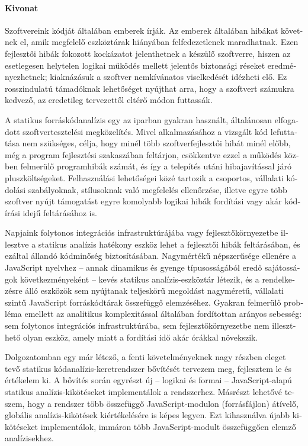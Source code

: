 \begin{otherlanguage}{magyar}

  \paragraph*{Kivonat}
  \thispagestyle{plain}

  Szoftvereink kódját általában emberek írják. Az emberek általában hibákat követnek el, amik megfelelő eszköztárak hiányában felfedezetlenek maradhatnak. Ezen fejlesztői hibák fokozott kockázatot jelenthetnek a készülő szoftverre, hiszen az esetlegesen helytelen logikai működés mellett jelentős biztonsági réseket eredményezhetnek; kiaknázásuk a szoftver nemkívánatos viselkedését idézheti elő. Ez rosszindulatú támadóknak lehetőséget nyújthat arra, hogy a szoftvert számukra kedvező, az eredetileg tervezettől eltérő módon futtassák.

  A statikus forráskódanalízis egy az iparban gyakran használt, általánosan elfogadott szoftvertesztelési megközelítés. Mivel alkalmazásához a vizsgált kód lefuttatása nem szükséges, célja, hogy minél több szoftverfejlesztői hibát minél előbb, még a program fejlesztési szakaszában feltárjon, csökkentve ezzel a működés közben felmerülő programhibák számát, és így a telepítés utáni hibajavítással járó pluszköltségeket. Felhasználási lehetőségei közé tartozik a csoportos, vállalati kódolási szabályoknak, stílusoknak való megfelelés ellenőrzése, illetve egyre több szoftver nyújt támogatást egyre komolyabb logikai hibák fordítási vagy akár kódírási idejű feltárásához is.

  Napjaink folytonos integrációs infrastruktúrájába vagy fejlesztőkörnyezetbe illesztve a statikus analízis hatékony eszköz lehet a fejlesztői hibák feltárásában, és ezáltal állandó kódminőség biztosításában. Nagymértékű népszerűsége ellenére a JavaScript nyelvhez – annak dinamikus és gyenge típusosságából eredő sajátosságok következményeként – kevés statikus analízis-eszköztár létezik, és a rendelkezésre álló eszközök sem nyújtanak teljeskörű megoldást nagyméretű, vállalati szintű JavaScript forráskódtárak összefüggő elemzéséhez. Gyakran felmerülő probléma emellett az analitikus komplexitással általában fordítottan arányos sebesség: sem folytonos integrációs infrastruktúrába, sem fejlesztőkörnyezetbe nem illeszthető olyan eszköz, amely miatt a fordítási idő akár órákkal növekszik.

  Dolgozatomban egy már létező, a fenti követelményeknek nagy részben eleget tevő statikus kódanalízis-keretrendszer bővítését tervezem meg, fejlesztem le és értékelem ki. A bővítés során egyrészt új – logikai és formai – JavaScript-alapú statikus analízis-kikötéseket implementálok a rendszerhez. Másrészt lehetővé teszem, hogy a rendszer több összefüggő JavaScript-modulon (forrásfájlon) átívelő, globális analízis-kikötések kiértékelésére is képes legyen. Ezt kihasználva újabb kikötéseket implementálok, immáron több JavaScript-modult összefüggően elemző analízisekhez.

\end{otherlanguage}

